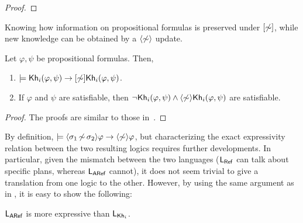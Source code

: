\begin{proof}
%
%
%
\end{proof}

Knowing how information on propositional formulas is preserved under $[\not\sim]$, while new knowledge can be obtained by a $\langle \not\sim \rangle$ update.
\medskip

\begin{proposition}\label{prop:aref-preserves-gains}
Let $\varphi,\psi$ be propositional formulas. Then, 
\begin{enumerate}
\item\label{itm:aref:preservesknowledge} $\models {\sf Kh}_i(\varphi,\psi) \rightarrow [\not\sim]{\sf Kh}_i(\varphi,\psi)$.
\item\label{itm:aref:gainsknowledge} If $\varphi$ and $\psi$ are satisfiable, then $\neg{\sf Kh}_i(\varphi,\psi) \wedge \langle \not\sim \rangle{\sf Kh}_i(\varphi,\psi)$ are satisfiable.
\end{enumerate}
\end{proposition}
\begin{proof}
The proofs are similar to those in~.
\end{proof}

By definition, $\models \langle \sigma_1{\,\not\sim\,}\sigma_2 \rangle\varphi \rightarrow \langle \not\sim \rangle\varphi$, but characterizing the exact expressivity relation between the two resulting logics requires further developments.
In particular, given the mismatch between the two languages ($\mathsf{L_{Ref}}$ can talk about specific plans, whereas $\mathsf{L_{ARef}}$ cannot), it does not seem trivial to give a translation from one logic to the other.
However, by using the same argument as in , it is easy to show the following:

\medskip

\begin{proposition}\label{prop:exparef}
$\mathsf{L_{ARef}}$ is more expressive than $\mathsf{L}_{{\sf Kh}_i}$.
\end{proposition}

